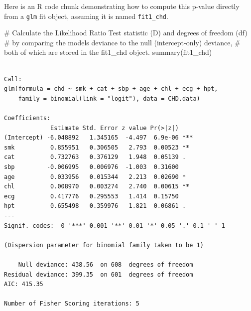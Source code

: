 \documentclass[
  letterpaper,
  DIV=11,
  numbers=noendperiod]{scrreprt}
\newenvironment{Shaded}{\begin{snugshade}}{\end{snugshade}}
\newcommand{\CommentTok}[1]{\textcolor[rgb]{0.37,0.37,0.37}{#1}}
\newcommand{\FunctionTok}[1]{\textcolor[rgb]{0.28,0.35,0.67}{#1}}
\newcommand{\NormalTok}[1]{\textcolor[rgb]{0.00,0.23,0.31}{#1}}
\begin{document}
Here is an R code chunk demonstrating how to compute this p-value
directly from a \texttt{glm} fit object, assuming it is named
\texttt{fit1\_chd}.

\begin{Shaded}
\begin{Highlighting}[]
\CommentTok{\# Calculate the Likelihood Ratio Test statistic (D) and degrees of freedom (df)}
\CommentTok{\# by comparing the model\textquotesingle{}s deviance to the null (intercept{-}only) deviance,}
\CommentTok{\# both of which are stored in the \textquotesingle{}fit1\_chd\textquotesingle{} object.}
\FunctionTok{summary}\NormalTok{(fit1\_chd)}
\end{Highlighting}
\end{Shaded}

\begin{verbatim}

Call:
glm(formula = chd ~ smk + cat + sbp + age + chl + ecg + hpt, 
    family = binomial(link = "logit"), data = CHD.data)

Coefficients:
             Estimate Std. Error z value Pr(>|z|)    
(Intercept) -6.048892   1.345165  -4.497  6.9e-06 ***
smk          0.855951   0.306505   2.793  0.00523 ** 
cat          0.732763   0.376129   1.948  0.05139 .  
sbp         -0.006995   0.006976  -1.003  0.31600    
age          0.033956   0.015344   2.213  0.02690 *  
chl          0.008970   0.003274   2.740  0.00615 ** 
ecg          0.417776   0.295553   1.414  0.15750    
hpt          0.655498   0.359976   1.821  0.06861 .  
---
Signif. codes:  0 '***' 0.001 '**' 0.01 '*' 0.05 '.' 0.1 ' ' 1

(Dispersion parameter for binomial family taken to be 1)

    Null deviance: 438.56  on 608  degrees of freedom
Residual deviance: 399.35  on 601  degrees of freedom
AIC: 415.35

Number of Fisher Scoring iterations: 5
\end{verbatim}
\end{document}
